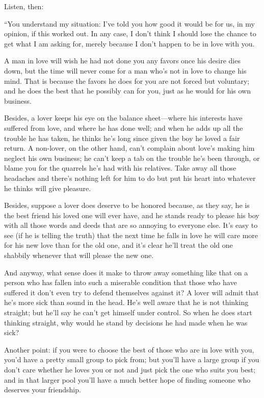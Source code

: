 \sayphaedrus Listen, then:

“You understand my situation: I've told you how good it would be for us,
in my opinion, if this worked out. In any case, I don't think I should 
lose the chance to get what I am asking for, merely
because I don't happen to be in love with you.

A man in love will wish he had not done you any favors once his desire
dies down, but the time will never come for a man who's not in love to
change his mind. That is because the favors he does for you are not
forced but voluntary; and he does the best that he possibly can for you,
just as he would for his own business.

Besides, a lover keeps his eye on the balance sheet---where his
interests have suffered from love, and where he has done well; and when
he adds up all the trouble he has taken, he thinks he's long since given
the boy he loved a fair return. A non-lover, on the other hand,
can't complain about love's making him neglect his own business; he
can't keep a tab on the trouble he's been through, or blame you for the
quarrels he's had with his relatives. Take away all those headaches and
there's nothing left for him to do but put his heart into whatever he
thinks will give pleasure.

Besides, suppose a lover does deserve to be honored because, as they 
say, he is the best friend his loved one will ever have, and he
stands ready to please his boy with all those words and deeds that are
so annoying to everyone else. It's easy to see (if he is telling the
truth) that the next time he falls in love he will care more for his new
love than for the old one, and it's clear he'll treat the old one
shabbily whenever that will please the new one.

And anyway, what sense does it make to throw away something like that
on a person who has fallen into such a miserable condition that those 
who have suffered it don't even try to defend themselves against
it? A lover will admit that he's more sick than sound in the head. He's
well aware that he is not thinking straight; but he'll say he can't get
himself under control. So when he does start thinking straight, why
would he stand by decisions he had made when he was sick?

Another point: if you were to choose the best of those who are in love
with you, you'd have a pretty small group to pick from; but you'll have
a large group if you don't care whether he loves you or not and just
pick the one who suits you best; and in that larger pool you'll have a
much better hope of finding someone who deserves your friendship.

